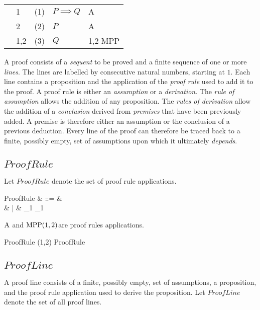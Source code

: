 \documentclass[11pt, oneside]{article}
\begin{document}
\begin{tabular}{l l r l l}
&	1	&	(1)	&	$P \implies Q$	&	A \\
&	2	&	(2)	&	$P$			&	A \\
&	1,2	&	(3)	&	$Q$			&	1,2 MPP
\end{tabular}

\vspace{1ex}

A proof consists of a {\it sequent} to be proved and a finite sequence of one or more {\it lines}.
The lines are labelled by consecutive natural numbers, starting at $1$.
Each line contains a proposition and the application of the {\it proof rule} used to add it to the proof. 
A proof rule is either an {\it assumption} or a {\it derivation}.
The {\it rule of assumption} allows the addition of any proposition.
The {\it rules of derivation} allow the addition of a {\it conclusion} derived from {\it premises} that have been
previously added.
A premise is therefore either an assumption or the conclusion of a previous deduction.
Every line of the proof can therefore be traced back to a finite, possibly empty, set of assumptions upon
which it ultimately {\it depends}.

\subsection{$ProofRule$}

Let $ProofRule$ denote the set of proof rule applications.

\begin{syntax}
	ProofRule	& ::= &  \\
			&  |	&  \ldata \nat_1 \cross \nat_1 \rdata
\end{syntax}

\begin{example}
$\operatorname{A}$ and $\operatorname{MPP}(1,2)$are proof rules applications.

\begin{zed}
	 \in ProofRule
\also
	(1,2) \in ProofRule
\end{zed}

\end{example}

\subsection{$ProofLine$}

A proof line consists of a finite, possibly empty, set of assumptions, a proposition,
and the proof rule application used to derive the proposition.
Let $ProofLine$ denote the set of all proof lines.
\end{document}
